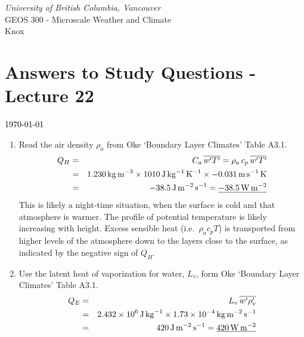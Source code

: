 \documentclass[11pt]{article}
\author{Andy Black and Andreas Christen}
\begin{document}
\begin{center}
\emph{University of British Columbia, Vancouver}\\
GEOS 300 - Microscale Weather and Climate\\
Knox
\section*{Answers to Study Questions - Lecture 22}
\textcolor{black}{\today}
\end{center}

\begin{enumerate}

\item Read the air density $\rho_a$ from Oke `Boundary Layer Climates' Table A3.1.
\begin{eqnarray*}
Q_H &=& C_a \, \overline{w^{\prime}T^{\prime}} = \rho_a \, c_p \, \overline{w^{\prime}T^{\prime}} \\
&=& 1.230\,\rm{kg}\,\rm{m}^{-3} \times 1010 \,\rm{J}\,\rm{kg}^{-1}\,\rm{K}^{-1} \times -0.031 \,\rm{m}\,\rm{s}^{-1}\,\rm{K} \\
&=& -38.5 \,\rm{J}\,\rm{m}^{-2}\,\rm{s}^{-1} =  \underline{ -38.5\,\rm{W}\,\rm{m}^{-2}}
\end{eqnarray*}
This is likely a night-time situation, when the surface is cold and that atmosphere is warmer. The profile of potential temperature is likely increasing with height. Excess sensible heat (i.e.\ $\rho_a c_p T$) is transported from higher levels of the atmosphere down to the layers close to the surface, as indicated by the negative sign of $Q_H$. 

\item Use the latent heat of vaporization for water, $L_v$, form Oke `Boundary Layer Climates' Table A3.1.
\begin{eqnarray*}
Q_E &=& L_v \, \overline{w^{\prime}\rho_v^{\prime}} \\
&=& 2.432 \times 10^{6} \,\rm{J}\,\rm{kg}^{-1} \times 1.73 \times 10^{-4}\, \rm{kg}\,\rm{m}^{-2}\,\rm{s}^{-1} \\
&=& 420 \,\rm{J}\,\rm{m}^{-2}\,\rm{s}^{-1} =  \underline{420\,\rm{W}\,\rm{m}^{-2}}
\end{eqnarray*}


\end{enumerate}
\end{document}
